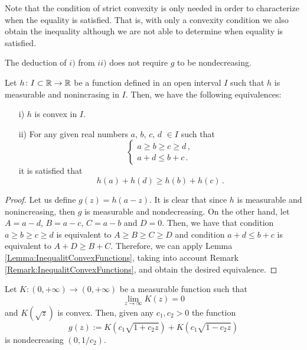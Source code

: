 \begin{remark}
\label{Remark:InequalitConvexFunctions}
Note that the condition of strict convexity is only needed in order to characterize when the equality is satisfied. That is, with only a convexity condition we also obtain the inequality although we are not able to determine when equality is satisfied. 
\end{remark}
\begin{remark}
\label{Remark:LeftImplicationDoNotRequireNondecreasing}
The deduction of $i)$ from $ii)$ does not require $g$ to be nondecreasing.
\end{remark}

\begin{corollary}
\label{Cor:hDecreasingConvex}
Let $h \colon I\subset \mathbb{R} \to \mathbb{R}$ be a function defined in an open interval $I$ such that $h$ is measurable and nonincrasing in $I$. Then, we have the following equivalences:
\begin{enumerate}
\item[i)] $h$ is convex in $I$.
\item[ii)] For any given real numbers $a$, $b$, $c$, $d$ $\in I$ such that 
\begin{equation}
\label{Eq:AssumptionsInequalitiesABCD}
\begin{cases}
a \geq b \geq c \geq d \,, \\
a + d \leq b + c\,.
\end{cases}
\end{equation}
it is satisfied that
$$ h(a) + h(d) \geq h(b) + h(c)\,.$$
\end{enumerate}
\end{corollary}

\begin{proof}
Let us define $g(z) = h(a-z)$. It is clear that since $h$ is measurable and nonincreasing, then $g$ is measurable and nondecreasing.
On the other hand, let $A=a-d$, $B=a-c$, $C=a-b$ and $D=0$. Then, we have that condition $a \geq b \geq c \geq d$ is equivalent to $A\geq B \geq C \geq D$ and condition $a+d\leq b+c$ is equivalent to $A+D\geq B+C$.
Therefore, we can apply Lemma \ref{Lemma:InequalitConvexFunctions}, taking into account Remark \ref{Remark:InequalitConvexFunctions}, and obtain the desired equivalence.
\end{proof}


\begin{lemma}
\label{Lemma:gNondecreasing}
Let $K:(0,+\infty) \to (0,+\infty)$ be a measurable function such that
$$ \lim_{z\to\infty} K(z) = 0 $$
and $ K(\sqrt{z}) $ is convex. Then, given any $c_1,c_2>0$ the function
$$
g(z) := K(c_1 \sqrt{1 + c_2 z}) +  K(c_1 \sqrt{1 - c_2 z})
$$
is nondecreasing $(0, 1/c_2)$.
\end{lemma}


